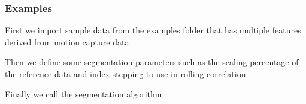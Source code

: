 \documentclass[letterpaper,10pt,english]{sphinxmanual}
\begin{document}
\begin{fulllineitems}
\begin{quote}
\begin{description}
\begin{description}
\end{description}

\end{description}\end{quote}
\subsubsection*{Examples}

\begin{sphinxVerbatim}[commandchars=\\\{\}]
   
\end{sphinxVerbatim}

\sphinxAtStartPar
First we import sample data from the examples folder that has multiple
features derived from motion capture data

\begin{sphinxVerbatim}[commandchars=\\\{\}]
 
  
\end{sphinxVerbatim}

\sphinxAtStartPar
Then we define some segmentation parameters such as the scaling percentage
of the reference data and index stepping to use in rolling correlation

\begin{sphinxVerbatim}[commandchars=\\\{\}]
   
   
   
\end{sphinxVerbatim}

\sphinxAtStartPar
Finally we call the segmentation algorithm

\begin{sphinxVerbatim}[commandchars=\\\{\}]
\PYG{g+go}{array([[207.       , 240.       ,   0.9124224],}
\PYG{g+go}{       [ 72.       , 112.       ,   0.8776795]])}
\end{sphinxVerbatim}

\end{fulllineitems}
\end{document}
